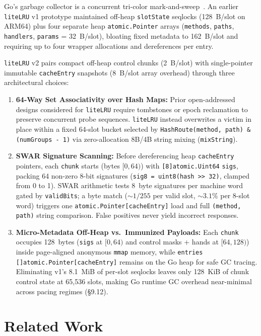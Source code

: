 \documentclass[11pt,a4paper]{article}
\begin{document}
Go's garbage collector is a concurrent tri-color mark-and-sweep~\cite{gogc2018}. An earlier \texttt{liteLRU} v1 prototype maintained off-heap \texttt{slotState} seqlocks (128~B/slot on ARM64) plus four separate heap \texttt{atomic.Pointer} arrays (\texttt{methods}, \texttt{paths}, \texttt{handlers}, \texttt{params} = 32~B/slot), bloating fixed metadata to 162~B/slot and requiring up to four wrapper allocations and dereferences per entry.

\texttt{liteLRU} v2 pairs compact off-heap control chunks (2~B/slot) with single-pointer immutable \texttt{cacheEntry} snapshots (8~B/slot array overhead) through three architectural choices:

\begin{enumerate}
    \item \textbf{64-Way Set Associativity over Hash Maps:} Prior open-addressed designs considered for \texttt{liteLRU} require tombstones or epoch reclamation to preserve concurrent probe sequences. \texttt{liteLRU} instead overwrites a victim in place within a fixed 64-slot bucket selected by \texttt{HashRoute(method, path) \& (numGroups - 1)} via zero-allocation 8B/4B string mixing (\texttt{mixString}).
    \item \textbf{SWAR Signature Scanning:} Before dereferencing heap \texttt{cacheEntry} pointers, each \texttt{chunk} starts (bytes $[0,64)$) with \texttt{[8]atomic.Uint64} \texttt{sigs}, packing 64 non-zero 8-bit signatures (\texttt{sig8 = uint8(hash >> 32)}, clamped from 0 to 1). SWAR arithmetic tests 8~byte signatures per machine word gated by \texttt{validBits}; a byte match ($\sim 1/255$ per valid slot, $\sim 3.1\%$ per 8-slot word) triggers one \texttt{atomic.Pointer[cacheEntry]} load and full \texttt{(method, path)} string comparison. False positives never yield incorrect responses.
    \item \textbf{Micro-Metadata Off-Heap vs.\ Immunized Payloads:} Each \texttt{chunk} occupies 128~bytes (\texttt{sigs} at $[0,64)$ and control masks + hands at $[64,128)$) inside page-aligned anonymous \texttt{mmap} memory, while \texttt{entries []atomic.Pointer[cacheEntry]} remains on the Go heap for safe GC tracing. Eliminating v1's 8.1~MiB of per-slot seqlocks leaves only 128~KiB of chunk control state at 65,536 slots, making Go runtime GC overhead near-minimal across pacing regimes (\S 9.12).
\end{enumerate}

\section{Related Work}
\label{sec:related}
\end{document}
